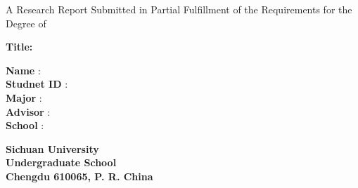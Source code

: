 \begin{titlepage}

\Large   
\centering    
 
    A Research Report Submitted in Partial Fulfillment of the Requirements for the Degree of \degree
    
\vspace{3cm}

    \textbf{Title: \mytitle \LARGE}
    
\vspace{4cm}
 
\flushleft
\setlength{\leftskip}{1cm}
\large

    \textbf{Name} \hspace{1.42cm}  : \hspace{0.3cm}  \myauthor \\
    \textbf{Studnet ID} \hspace{0.5cm}       : \hspace{0.3cm}  \studentid \\
    \textbf{Major} \hspace{1.32cm}      : \hspace{0.3cm}  \major \\
    \textbf{Advisor} \hspace{1cm}       : \hspace{0.3cm}  \advisor \\
    \textbf{School} \hspace{1.3cm}      : \hspace{0.3cm}  \school

\vfill

\centering

    \textbf{
    Sichuan University \\
    Undergraduate School \\
    Chengdu 610065, P. R. China \\
    \mydate}

\end{titlepage}
